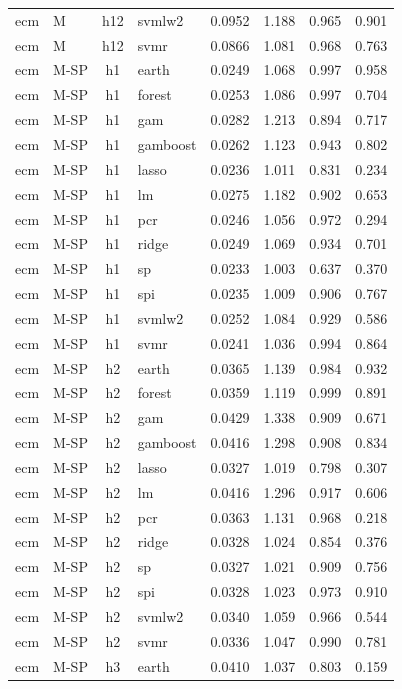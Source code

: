 \begin{ThreePartTable}
\begin{longtable}[t]{llclcccc}
ecm & M & h12 & svmlw2 & 0.0952 & 1.188 & 0.965 & 0.901\\
ecm & M & h12 & svmr & 0.0866 & 1.081 & 0.968 & 0.763\\
\addlinespace
ecm & M-SP & h1 & earth & 0.0249 & 1.068 & 0.997 & 0.958\\
ecm & M-SP & h1 & forest & 0.0253 & 1.086 & 0.997 & 0.704\\
ecm & M-SP & h1 & gam & 0.0282 & 1.213 & 0.894 & 0.717\\
ecm & M-SP & h1 & gamboost & 0.0262 & 1.123 & 0.943 & 0.802\\
ecm & M-SP & h1 & lasso & 0.0236 & 1.011 & 0.831 & 0.234\\
ecm & M-SP & h1 & lm & 0.0275 & 1.182 & 0.902 & 0.653\\
ecm & M-SP & h1 & pcr & 0.0246 & 1.056 & 0.972 & 0.294\\
ecm & M-SP & h1 & ridge & 0.0249 & 1.069 & 0.934 & 0.701\\
ecm & M-SP & h1 & sp & 0.0233 & 1.003 & 0.637 & 0.370\\
ecm & M-SP & h1 & spi & 0.0235 & 1.009 & 0.906 & 0.767\\
ecm & M-SP & h1 & svmlw2 & 0.0252 & 1.084 & 0.929 & 0.586\\
ecm & M-SP & h1 & svmr & 0.0241 & 1.036 & 0.994 & 0.864\\
\addlinespace
ecm & M-SP & h2 & earth & 0.0365 & 1.139 & 0.984 & 0.932\\
ecm & M-SP & h2 & forest & 0.0359 & 1.119 & 0.999 & 0.891\\
ecm & M-SP & h2 & gam & 0.0429 & 1.338 & 0.909 & 0.671\\
ecm & M-SP & h2 & gamboost & 0.0416 & 1.298 & 0.908 & 0.834\\
ecm & M-SP & h2 & lasso & 0.0327 & 1.019 & 0.798 & 0.307\\
ecm & M-SP & h2 & lm & 0.0416 & 1.296 & 0.917 & 0.606\\
ecm & M-SP & h2 & pcr & 0.0363 & 1.131 & 0.968 & 0.218\\
ecm & M-SP & h2 & ridge & 0.0328 & 1.024 & 0.854 & 0.376\\
ecm & M-SP & h2 & sp & 0.0327 & 1.021 & 0.909 & 0.756\\
ecm & M-SP & h2 & spi & 0.0328 & 1.023 & 0.973 & 0.910\\
ecm & M-SP & h2 & svmlw2 & 0.0340 & 1.059 & 0.966 & 0.544\\
ecm & M-SP & h2 & svmr & 0.0336 & 1.047 & 0.990 & 0.781\\
\addlinespace
ecm & M-SP & h3 & earth & 0.0410 & 1.037 & 0.803 & 0.159\\

\end{longtable}
\end{ThreePartTable}
